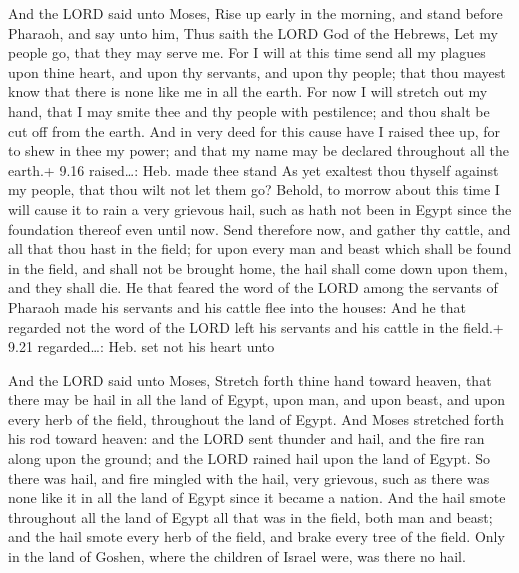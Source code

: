  And the LORD said unto Moses, Rise up early in the
morning, and stand before Pharaoh, and say unto him, Thus saith the LORD
God of the Hebrews, Let my people go, that they may serve me.
 For I will at this time send all my plagues upon thine
heart, and upon thy servants, and upon thy people; that thou mayest know
that there is none like me in all the earth.  For now I
will stretch out my hand, that I may smite thee and thy people with
pestilence; and thou shalt be cut off from the earth.  And
in very deed for this cause have I raised thee up, for to shew in thee
my power; and that my name may be declared throughout all the earth.+
9.16 raised\ldots: Heb. made thee stand  As yet exaltest
thou thyself against my people, that thou wilt not let them go?
 Behold, to morrow about this time I will cause it to rain
a very grievous hail, such as hath not been in Egypt since the
foundation thereof even until now.  Send therefore now, and
gather thy cattle, and all that thou hast in the field; for upon every
man and beast which shall be found in the field, and shall not be
brought home, the hail shall come down upon them, and they shall die.
 He that feared the word of the LORD among the servants of
Pharaoh made his servants and his cattle flee into the houses:
 And he that regarded not the word of the LORD left his
servants and his cattle in the field.+ 9.21 regarded\ldots: Heb. set not
his heart unto

 And the LORD said unto Moses, Stretch forth thine hand
toward heaven, that there may be hail in all the land of Egypt, upon
man, and upon beast, and upon every herb of the field, throughout the
land of Egypt.  And Moses stretched forth his rod toward
heaven: and the LORD sent thunder and hail, and the fire ran along upon
the ground; and the LORD rained hail upon the land of Egypt.
 So there was hail, and fire mingled with the hail, very
grievous, such as there was none like it in all the land of Egypt since
it became a nation.  And the hail smote throughout all the
land of Egypt all that was in the field, both man and beast; and the
hail smote every herb of the field, and brake every tree of the field.
 Only in the land of Goshen, where the children of Israel
were, was there no hail.

